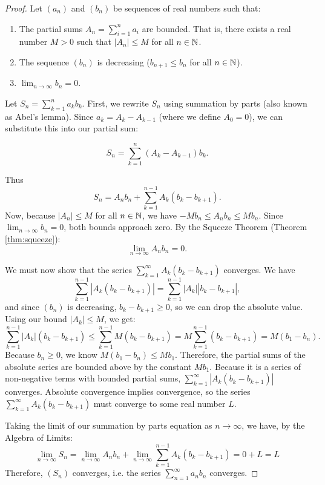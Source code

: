 \documentclass[../analysis1.tex]{subfiles}
\begin{document}
\begin{proof}
    Let $(a_n)$ and $(b_n)$ be sequences of real numbers such that:
    \begin{enumerate}
        \item[1.] The partial sums $A_n = \sum_{i=1}^n a_i$ are bounded. That is, there exists a real number $M > 0$ such that $|A_n| \le M$ for all $n \in \mathbb{N}$.
        \item[2.] The sequence $(b_n)$ is decreasing ($b_{n+1} \le b_n$ for all $n \in \mathbb{N}$).
        \item[3.] $\lim_{n \to \infty} b_n = 0$.
    \end{enumerate}
Let $S_n = \sum_{k=1}^n a_k b_k.$ First, we rewrite $S_n$ using summation by parts (also known as Abel's lemma). Since $a_k = A_k - A_{k-1}$ (where we define $A_0 = 0$), we can substitute this into our partial sum:

\[ S_n = \sum_{k=1}^n (A_k - A_{k-1}) b_k. \]

Thus
\[ S_n = A_n b_n + \sum_{k=1}^{n-1} A_k (b_k - b_{k+1}). \]
Now, because $|A_n| \le M$ for all $n \in \mathbb{N}$, we have $\allowbreak -M b_n \le A_n b_n \le M b_n$.
Since $\lim_{n \to \infty} b_n = 0$, both bounds approach zero. By the Squeeze Theorem (Theorem \ref{thm:squeeze}):
\[ \lim_{n \to \infty} A_n b_n = 0. \]

We must now show that the series $\sum_{k=1}^{\infty} A_k (b_k - b_{k+1})$ converges. We have
\[ \sum_{k=1}^{n-1} |A_k (b_k - b_{k+1})| = \sum_{k=1}^{n-1} |A_k| |b_k - b_{k+1}|, \]
and since $(b_n)$ is decreasing, $b_k - b_{k+1} \ge 0$, so we can drop the absolute value. Using our bound $|A_k| \le M$, we get:
\[ \sum_{k=1}^{n-1} |A_k| (b_k - b_{k+1}) \le \sum_{k=1}^{n-1} M (b_k - b_{k+1}) = M \sum_{k=1}^{n-1} (b_k - b_{k+1}) = M(b_1 - b_n). \]
Because $b_n \ge 0$, we know $M(b_1 - b_n) \le M b_1$. Therefore, the partial sums of the absolute series are bounded above by the constant $M b_1$. Because it is a series of non-negative terms with bounded partial sums, $\sum_{k=1}^{\infty} |A_k (b_k - b_{k+1})|$ converges. Absolute convergence implies convergence, so the series $\sum_{k=1}^{\infty} A_k (b_k - b_{k+1})$ must converge to some real number $L$.\par

Taking the limit of our summation by parts equation as $n \to \infty$, we have, by the Algebra of Limits:
\[ \lim_{n \to \infty} S_n = \lim_{n \to \infty} A_n b_n + \lim_{n \to \infty} \sum_{k=1}^{n-1} A_k (b_k - b_{k+1}) = 0 + L = L \]
Therefore, $(S_n)$ converges, i.e. the series $\sum_{n=1}^{\infty} a_n b_n$ converges.\qedhere
\end{proof}
\end{document}
